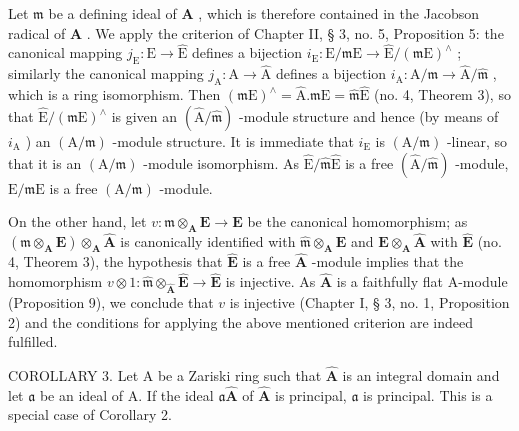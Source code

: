 Let \(\mathfrak{m}\) be a defining ideal of \(\mathbf{A}\) , which is therefore contained in the Jacobson radical of \(\mathbf{A}\) . We apply the criterion of Chapter II, § 3, no. 5, Proposition 5: the canonical mapping \(j_{\mathrm{E}}: \mathrm{E} \to \hat{\mathrm{E}}\) defines a bijection \(i_{\mathrm{E}}: \mathrm{E} / \mathfrak{m}\mathrm{E} \to \hat{\mathrm{E}} / (\mathfrak{m}\mathrm{E})^{\wedge}\) ; similarly the canonical mapping \(j_{\mathrm{A}}: \mathrm{A} \to \hat{\mathrm{A}}\) defines a bijection \(i_{\mathrm{A}}: \mathrm{A} / \mathfrak{m} \to \hat{\mathrm{A}} / \hat{\mathfrak{m}}\) , which is a ring isomorphism. Then \((\mathfrak{m}\mathrm{E})^{\wedge} = \hat{\mathrm{A}}. \mathfrak{m}\mathrm{E} = \hat{\mathfrak{m}}\hat{\mathrm{E}}\) (no. 4, Theorem 3), so that \(\hat{\mathrm{E}} / (\mathfrak{m}\mathrm{E})^{\wedge}\) is given an \((\hat{\mathrm{A}} / \hat{\mathfrak{m}})\) -module structure and hence (by means of \(i_{\mathrm{A}}\) ) an \((\mathrm{A} / \mathfrak{m})\) -module structure. It is immediate that \(i_{\mathrm{E}}\) is \((\mathrm{A} / \mathfrak{m})\) -linear, so that it is an \((\mathrm{A} / \mathfrak{m})\) -module isomorphism. As \(\hat{\mathrm{E}} / \hat{\mathfrak{m}}\hat{\mathrm{E}}\) is a free \((\hat{\mathrm{A}} / \hat{\mathfrak{m}})\) -module, \(\mathrm{E} / \mathfrak{m}\mathrm{E}\) is a free \((\mathrm{A} / \mathfrak{m})\) -module.

On the other hand, let \(v: \mathfrak{m} \otimes_{\mathbf{A}} \mathbf{E} \to \mathbf{E}\) be the canonical homomorphism; as \((\mathfrak{m} \otimes_{\mathbf{A}} \mathbf{E}) \otimes_{\mathbf{A}} \hat{\mathbf{A}}\) is canonically identified with \(\hat{\mathfrak{m}} \otimes_{\mathbf{A}} \hat{\mathbf{E}}\) and \(\mathbf{E} \otimes_{\mathbf{A}} \hat{\mathbf{A}}\) with \(\hat{\mathbf{E}}\) (no. 4, Theorem 3), the hypothesis that \(\hat{\mathbf{E}}\) is a free \(\hat{\mathbf{A}}\) -module implies that the homomorphism \(v \otimes 1: \hat{\mathfrak{m}} \otimes_{\hat{\mathbf{A}}} \hat{\mathbf{E}} \to \hat{\mathbf{E}}\) is injective. As \(\hat{\mathbf{A}}\) is a faithfully flat A-module (Proposition 9), we conclude that \(v\) is injective (Chapter I, § 3, no. 1, Proposition 2) and the conditions for applying the above mentioned criterion are indeed fulfilled.

COROLLARY 3. Let A be a Zariski ring such that \(\hat{\mathbf{A}}\) is an integral domain and let \(\mathfrak{a}\) be an ideal of A. If the ideal \(\mathfrak{a}\hat{\mathbf{A}}\) of \(\hat{\mathbf{A}}\) is principal, \(\mathfrak{a}\) is principal. This is a special case of Corollary 2.

